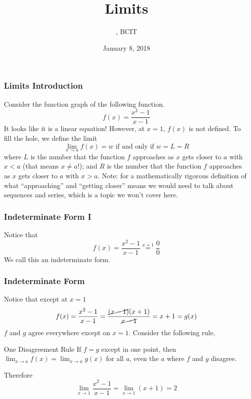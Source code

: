 \documentclass[xcolor=dvipsnames]{beamer}
\title{Limits}
\subtitle{{\CourseNumber}, BCIT}
\author{\CourseName}
\date{January 8, 2018}
\begin{document}
\begin{frame}
  \titlepage
\end{frame}

\begin{frame}
  \frametitle{Limits Introduction}
Consider the function graph of the following function.
\begin{equation}
  \label{eq:quiekong}
  f(x)=\frac{x^{2}-1}{x-1}
\end{equation}
It looks like it is a linear equation! However, at $x=1$, $f(x)$ is
not defined. To fill the hole, we define the limit
\begin{equation}
  \label{eq:vaineiro}
  \lim_{x\rightarrow{}a}f(x)=w\mbox{ if and only if }w=L=R
\end{equation}
where $L$ is the number that the function $f$ approaches as $x$ gets
closer to $a$ with $x<a$ (that means $x\neq{}a$!); and $R$ is the
number that the function $f$ approaches as $x$ gets closer to $a$ with
$x>a$. Note: for a mathematically rigorous definition of what
``approaching'' and ``getting closer'' means we would need to
talk about sequences and series, which is a topic we won't cover here.
\end{frame}

\begin{frame}
  \frametitle{Indeterminate Form I}
Notice that
\begin{equation}
  \label{eq:iicheeci}
  f(x)=\frac{x^{2}-1}{x-1}\overset{x=1}{=}\frac{0}{0}
\end{equation}
We call this an \alert{indeterminate form}.
\end{frame}

\begin{frame}
  \frametitle{Indeterminate Form}
Notice that except at $x=1$
\begin{equation}
  \label{eq:dooshool}
  f(x)=\frac{x^{2}-1}{x-1}=\frac{\cancel{(x-1)}(x+1)}{\cancel{x-1}}=x+1=g(x)
\end{equation}
$f$ and $g$ agree everywhere except on $x=1$. Consider the following
rule,
\begin{block}{One Disagreement Rule}
If $f=g$ except in one point, then
$\lim_{x\rightarrow{}a}f(x)=\lim_{x\rightarrow{}a}g(x)$ for all $a$,
even the $a$ where $f$ and $g$ disagree.
\end{block}
Therefore
\begin{equation}
  \label{eq:eengemia}
  \lim_{x\rightarrow{}1}\frac{x^{2}-1}{x-1}=\lim_{x\rightarrow{}1}(x+1)=2
\end{equation}
\end{frame}
\end{document}
